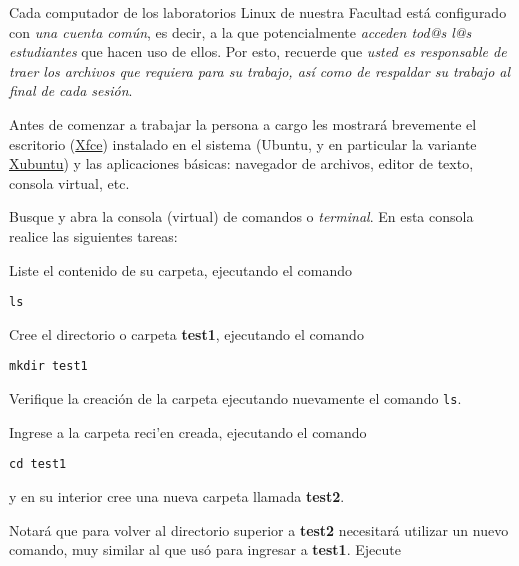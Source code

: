 \documentclass[11pt]{exam}
\begin{document}
\begin{questions}

\item Cada computador de los laboratorios Linux de nuestra Facultad está configurado con \textit{una cuenta común}, es decir, a la que potencialmente \textit{acceden tod@s l@s estudiantes} que hacen uso de ellos. Por esto, recuerde que \textit{usted es responsable de traer los archivos que requiera para su trabajo, así como de respaldar su trabajo al final de cada sesión}.

\item Antes de comenzar a trabajar la persona a cargo les mostrar\'a brevemente
el escritorio (\href{http://www.xfce.org/?lang=es}{Xfce}) instalado en el sistema (Ubuntu, y en particular la variante \href{http://xubuntu.org/}{Xubuntu}) y las aplicaciones b\'asicas: navegador de archivos, editor de texto, consola virtual, etc.

\item Busque y abra la consola (virtual) de comandos o \textit{terminal}. En esta consola realice las siguientes tareas:
\begin{parts}
\item Liste el contenido de su carpeta, ejecutando el comando 

\begin{verbatim}
ls
\end{verbatim}

\item Cree el directorio o carpeta \textbf{test1}, ejecutando el comando 

\begin{verbatim}
mkdir test1
\end{verbatim}

Verifique la creación de la carpeta ejecutando nuevamente el comando \texttt{ls}.

\item Ingrese a la carpeta reci'en creada, ejecutando el comando 

\begin{verbatim}
cd test1
\end{verbatim}

y en su interior cree una nueva carpeta llamada \textbf{test2}.

\item Notará que para volver al directorio superior a \textbf{test2} necesitará utilizar un nuevo comando, muy similar al que usó para ingresar a \textbf{test1}. Ejecute


\end{parts}
\end{questions}
\end{document}
